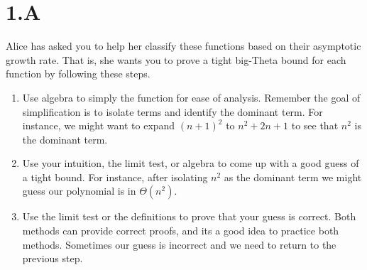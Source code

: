 \section{1.A}
    Alice has asked you to help her classify these functions based on their asymptotic growth rate. That is, she wants you to prove a tight big-Theta bound for each function by following these steps.
    \begin{enumerate}
        \item Use algebra to simply the function for ease of analysis. Remember the goal of simplification is to isolate terms and identify the dominant term. For instance, we might want to expand $(n+1)^2$ to $n^2 +2n +1$ to see that $n^2$ is the dominant term.
        
        \item Use your intuition, the limit test, or algebra to come up with a good guess of a tight bound. For instance, after isolating $n^2$ as the dominant term we might guess our polynomial is in $\Theta(n^2)$.
        
        \item Use the limit test or the definitions to prove that your guess is correct. Both methods can provide correct proofs, and its a good idea to practice both methods. Sometimes our guess is incorrect and we need to return to the previous step.
        
    \end{enumerate}